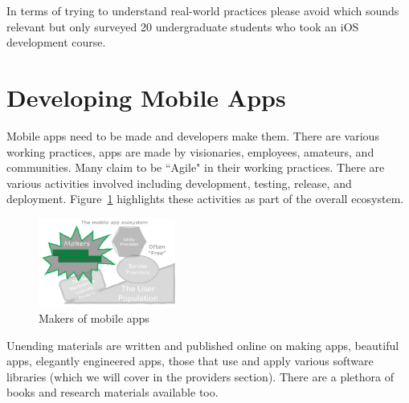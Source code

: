 In terms of trying to understand real-world practices please avoid \citet{santos2016_investigating_the_adoption_of_agile_practices_by_20_undergrad_students_in_mobile_app_devt} which sounds relevant but only surveyed 20 undergraduate students who took an iOS development course. 

\section{Developing Mobile Apps}
Mobile apps need to be made and developers make them. There are various working practices, apps are made by visionaries, employees, amateurs, and communities. Many claim to be ``Agile" in their working practices. There are various activities involved including development, testing, release, and deployment. Figure~\ref{fig:my_mobile-app-makers} highlights these activities as part of the overall ecosystem.

\begin{figure}
    \centering
    \includegraphics[width=0.4\textwidth]{images/my/the-mobile-app-ecosystem-makers-dtrd.png}
    \caption{Makers of mobile apps}
    \label{fig:my_mobile-app-makers}
\end{figure}

Unending materials are written and published online on making apps, beautiful apps, elegantly engineered apps, those that use and apply various software libraries (which we will cover in the providers section). There are a plethora of books and research materials available too. 



